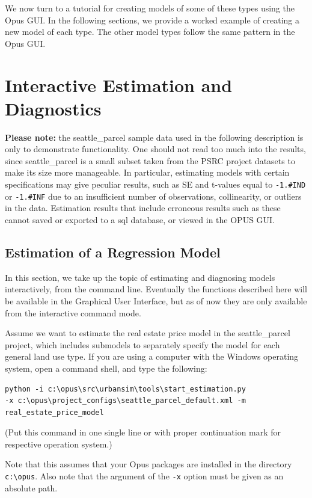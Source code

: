 We now turn to a tutorial for creating models of some of
these types using the Opus GUI.  In the following sections,
we provide a worked example of creating a new model of each
type.  The other model types follow the same pattern in the
Opus GUI.


\section{Interactive Estimation and Diagnostics}
\label{sec:components-model-estimation}
{\bf Please note:} the seattle\_parcel sample data used in the following
description is only to demonstrate functionality.  One should not read too
much into the results, since seattle\_parcel is a small subset taken from
the PSRC project datasets to make its size more manageable.  In particular,
estimating models with certain specifications may give peculiar results,
such as SE and t-values equal to \verb|-1.#IND| or \verb|-1.#INF| due to
an insufficient number of observations, collinearity, or outliers in the
data.  Estimation results that include erroneous results such as these
cannot saved or exported to a sql database, or viewed in the OPUS GUI\@.

\subsection{Estimation of a Regression Model}

In this section, we take up the topic of estimating and diagnosing models
interactively, from the command line.  Eventually the functions described
here will be available in the Graphical User Interface, but as of now they
are only available from the interactive command mode.

Assume we want to estimate the real estate price model in the
seattle\_parcel project, which includes submodels to separately specify the
model for each general land use type.  If you are using a computer with the
Windows operating system, open a command shell, and type the following:

\begin{verbatim}
python -i c:\opus\src\urbansim\tools\start_estimation.py 
-x c:\opus\project_configs\seattle_parcel_default.xml -m real_estate_price_model
\end{verbatim}
(Put this command in one single line or with proper continuation
mark for respective operation system.)

Note that this assumes that your Opus packages are installed in the directory \verb|c:\opus|. 
Also note that the argument of the \verb|-x| option must be given as an absolute path.  

